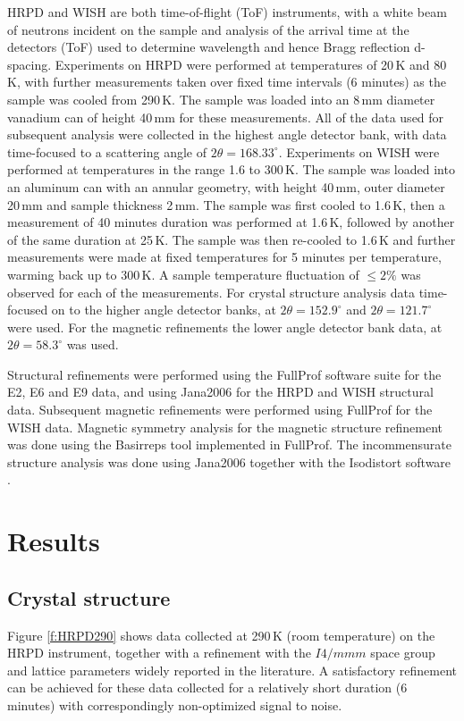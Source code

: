 \documentclass[prb,aps,twocolumn,superscriptaddress,showpacs,footinbib]{revtex4-2}
\begin{document}
HRPD and WISH are both time-of-flight (ToF) instruments, with a white beam of neutrons incident on the sample and analysis of the arrival time at the detectors (ToF) used to determine wavelength and hence Bragg reflection d-spacing. Experiments on HRPD were performed at temperatures of 20\,K and 80\,K, with further measurements taken over fixed time intervals (6 minutes) as the sample was cooled from 290\,K. The sample was loaded into an 8\,mm diameter vanadium can of height 40\,mm for these measurements. All of the data used for subsequent analysis were collected in the highest angle detector bank, with data time-focused to a scattering angle of $2\theta = 168.33^{\circ}$. Experiments on WISH were performed at temperatures in the range 1.6 to 300\,K. The sample was loaded into an aluminum can with an annular geometry, with height 40\,mm, outer diameter 20\,mm and sample thickness 2\,mm. The sample was first cooled to 1.6\,K, then a measurement of 40 minutes duration was performed at 1.6\,K, followed by another of the same duration at 25\,K. The sample was then re-cooled to 1.6\,K and further measurements were made at fixed temperatures for 5 minutes per temperature, warming back up to 300\,K. A sample temperature fluctuation of $\leq 2\%$ was observed for each of the measurements. For crystal structure analysis data time-focused on to the higher angle detector banks, at $2\theta = 152.9^{\circ}$ and $2\theta = 121.7^{\circ}$ were used. For the magnetic refinements the lower angle detector bank data, at $2\theta = 58.3^{\circ}$ was used.

Structural refinements were performed using the FullProf software suite \cite{FullProfStruc,FullProfMag} for the E2, E6 and E9 data, and using Jana2006 \cite{JanaSoftware} for the HRPD and WISH structural data. Subsequent magnetic refinements were performed using FullProf for the WISH data. Magnetic symmetry analysis for the magnetic structure refinement was done using the Basirreps tool implemented in FullProf. The incommensurate structure analysis was done using Jana2006 together with the Isodistort software \cite{Isotropy-url,Isotropy-article}.


\section{Results}\label{sec:results}

\subsection{Crystal structure}
Figure \ref{f:HRPD290} shows data collected at 290\,K (room temperature) on the HRPD instrument, together with a refinement with the $I4/mmm$ space group and lattice parameters widely reported in the literature. A satisfactory refinement can be achieved for these data collected for a relatively short duration (6 minutes) with correspondingly non-optimized signal to noise.
\end{document}
